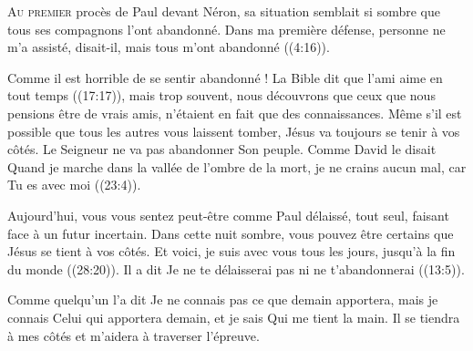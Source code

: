 \lettrine{A}{u premier} procès de Paul devant Néron,
 sa situation semblait si sombre que tous ses compagnons l'ont abandonné.
 \Og Dans ma première défense, personne ne m'a assisté,
 disait-il, mais tous m'ont abandonné \Fg{}
 ((4:16)).

Comme il est horrible de se sentir abandonné !
 La Bible dit que \Og l'ami 
 aime en tout temps \Fg{} ((17:17)), mais trop souvent,
 nous découvrons que ceux que nous pensions être de vrais amis,
 n'étaient en fait que des connaissances.
 Même s'il est possible que tous les autres vous laissent tomber,
 Jésus va toujours se tenir à vos côtés.
 Le Seigneur ne va pas abandonner Son peuple.
 Comme David le disait\frcolon{} 
 \Og Quand je marche dans la vallée de l'ombre de la mort,
 je ne crains aucun mal, car Tu es avec moi \Fg{} ((23:4)).


Aujourd'hui, vous vous sentez peut-être comme Paul \ocadr délaissé,
 tout seul, faisant face à un futur incertain.
 Dans cette nuit sombre, vous pouvez être certains que Jésus
 se tient à vos côtés.
 \Og Et voici, je suis avec vous tous les jours, jusqu'à la fin du monde \Fg{}
 ((28:20)).
 Il a dit\frcolon{} 
 \Og Je ne te délaisserai pas ni ne t'abandonnerai \Fg{}
 ((13:5)). 

Comme quelqu'un l'a dit\frcolon{} 
 \Og Je ne connais 
 pas ce que demain apportera, mais je connais Celui qui apportera demain,
 et je sais Qui me tient la main. \Fg{}
 Il se tiendra à mes côtés et m'aidera à traverser l'épreuve. 

\dvrule






